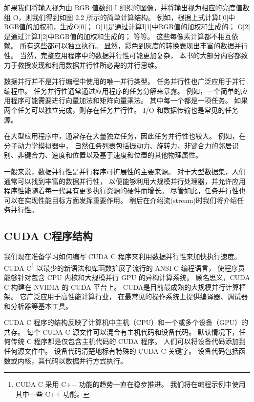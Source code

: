 如果我们将输入视为由 RGB 值数组 I 组织的图像，并将输出视为相应的亮度值数组 O，则我们得到如图 2.2 所示的简单计算结构。 
例如，根据上式计算I[0]中RGB值的加权和，生成O[0]； O[1]是通过计算I[1]中RGB值的加权和生成的； 
O[2]是通过计算I[2]中RGB值的加权和生成的； 等等。 这些每像素计算都不相互依赖。 所有这些都可以独立执行。 
显然，彩色到灰度的转换表现出丰富的数据并行性。 当然，完整应用程序中的数据并行性可能更加复杂，
本书的大部分内容都致力于教授发现和利用数据并行性所必需的并行思维。

\begin{remark}[任务并行与数据并行]
数据并行并不是并行编程中使用的唯一并行类型。 任务并行性也广泛应用于并行编程中。 
任务并行性通常通过应用程序的任务分解来暴露。 例如，一个简单的应用程序可能需要进行向量加法和矩阵向量乘法。 
其中每一个都是一项任务。 如果两个任务可以独立完成，则存在任务并行性。 I/O 和数据传输也是常见的任务源。

在大型应用程序中，通常存在大量独立任务，因此任务并行性也较大。 例如，在分子动力学模拟器中，
自然任务列表包括振动力、旋转力、非键合力的邻居识别、非键合力、速度和位置以及基于速度和位置的其他物理属性。

一般来说，数据并行性是并行程序可扩展性的主要来源。 对于大型数据集，人们通常可以找到丰富的数据并行性，
以便能够利用大规模并行处理器，并允许应用程序性能随着每一代具有更多执行资源的硬件而增长。 
尽管如此，任务并行性也可以在实现性能目标方面发挥重要作用。 稍后在介绍流(stream)时我们将介绍任务并行性。
\end{remark}

\subsection{CUDA C程序结构}
我们现在准备学习如何编写 CUDA C 程序来利用数据并行性来加快执行速度。 
CUDA C\footnote{CUDA C 采用 C++ 功能的趋势一直在稳步推进。 我们将在编程示例中使用其中一些 C++ 功能。} 
以最少的新语法和库函数扩展了流行的 ANSI C 编程语言，
使程序员能够针对包含 CPU 内核和大规模并行 GPU 的异构计算系统。 顾名思义，CUDA C 构建在 NVIDIA 的 CUDA 平台上。 
CUDA是目前最成熟的大规模并行计算框架。 它广泛应用于高性能计算行业，
在最常见的操作系统上提供编译器、调试器和分析器等基本工具。

CUDA C 程序的结构反映了计算机中主机（CPU）和一个或多个设备（GPU）的共存。 
每个 CUDA C 源文件可以混合有主机代码和设备代码。 默认情况下，任何传统 C 程序都是仅包含主机代码的 CUDA 程序。 
人们可以将设备代码添加到任何源文件中。 设备代码清楚地标有特殊的 CUDA C 关键字。 
设备代码包括函数或内核，其代码以数据并行方式执行。

